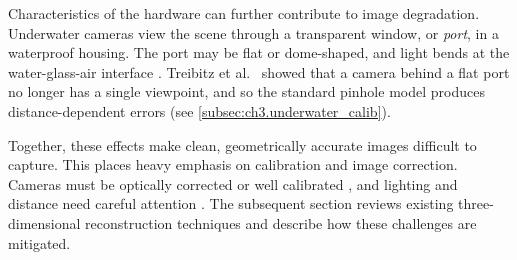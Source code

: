 Characteristics of the hardware can further contribute to image degradation.
Underwater cameras view the scene through a transparent window, or
\textit{port}, in a waterproof housing. The port may be flat or dome-shaped,
and light bends at the water-glass-air interface
\cite{shortisCalibrationTechniquesAccurate2015}.
Treibitz et al.~\cite{treibitzFlatRefractiveGeometry2012} showed that a camera
behind a flat port no longer has a single viewpoint, and so the
standard pinhole model produces distance-dependent errors (see
\autoref{subsec:ch3.underwater_calib}).


Together, these effects make clean, geometrically accurate images
difficult to capture. This places heavy emphasis on calibration and
image correction. Cameras must be optically corrected or well
calibrated \cite{shortisCalibrationTechniquesAccurate2015}, and
lighting and distance need careful attention
\cite{jaffeComputerModelingDesign1990}. The subsequent section
reviews existing three-dimensional reconstruction techniques and describe how these challenges are mitigated.

